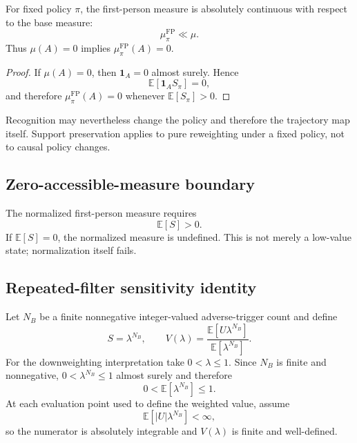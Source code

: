 \begin{proposition}
For fixed policy $\pi$, the first-person measure is absolutely continuous with respect to the base measure:
\[
\mu^{\mathrm{FP}}_\pi\ll\mu.
\]
Thus $\mu(A)=0$ implies $\mu^{\mathrm{FP}}_\pi(A)=0$.
\end{proposition}

\begin{proof}
If $\mu(A)=0$, then $\mathbf 1_A=0$ almost surely. Hence
\[
\mathbb E[\mathbf 1_A S_\pi]=0,
\]
and therefore $\mu^{\mathrm{FP}}_\pi(A)=0$ whenever $\mathbb E[S_\pi]>0$.
\end{proof}

Recognition may nevertheless change the policy and therefore the trajectory map itself. Support preservation applies to pure reweighting under a fixed policy, not to causal policy changes.

\subsection{Zero-accessible-measure boundary}

The normalized first-person measure requires
\[
\mathbb E[S]>0.
\]
If $\mathbb E[S]=0$, the normalized measure is undefined. This is not merely a low-value state; normalization itself fails.

\subsection{Repeated-filter sensitivity identity}

Let $N_B$ be a finite nonnegative integer-valued adverse-trigger count and define
\[
S=\lambda^{N_B},
\qquad
V(\lambda)
=
\frac{\mathbb E[U\lambda^{N_B}]}{\mathbb E[\lambda^{N_B}]}.
\]
For the downweighting interpretation take $0<\lambda\le1$. Since $N_B$ is finite and nonnegative, $0<\lambda^{N_B}\le1$ almost surely and therefore
\[
0<\mathbb E[\lambda^{N_B}]\le1.
\]
At each evaluation point used to define the weighted value, assume
\[
\mathbb E[|U|\lambda^{N_B}]<\infty,
\]
so the numerator is absolutely integrable and $V(\lambda)$ is finite and well-defined.


